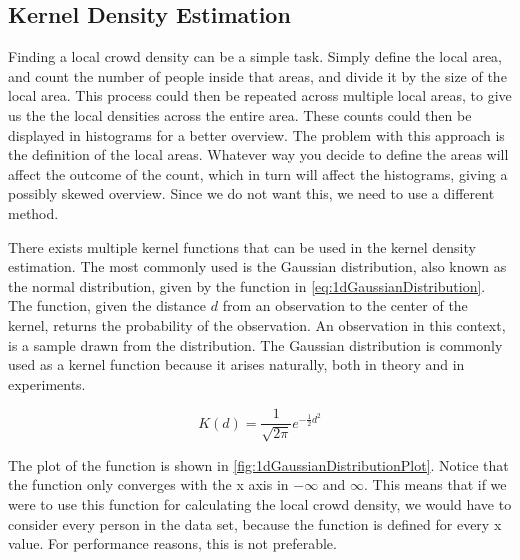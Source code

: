 \subsection{Kernel Density Estimation}

Finding a local crowd density can be a simple task. Simply define the local area, and count the number of people inside that areas, and divide it by the size of the local area. This process could then be repeated across multiple local areas, to give us the the local densities across the entire area. These counts could then be displayed in histograms for a better overview. The problem with this approach is the definition of the local areas. Whatever way you decide to define the areas will affect the outcome of the count, which in turn will affect the histograms, giving a possibly skewed overview. Since we do not want this, we need to use a different method.



There exists multiple kernel functions that can be used in the kernel density estimation. The most commonly used is the Gaussian distribution, also known as the normal distribution, given by the function in \cref{eq:1dGaussianDistribution}. The function, given the distance $d$ from an observation to the center of the kernel, returns the probability of the observation. An observation in this context, is a sample drawn from the distribution. The Gaussian distribution is commonly used as a kernel function because it arises naturally, both in theory and in experiments.

\begin{equation}
\label{eq:1dGaussianDistribution}
K(d) = \frac{1}{\sqrt{2\pi}} e^{-\frac{1}{2} d^2}
\end{equation}

The plot of the function is shown in \cref{fig:1dGaussianDistributionPlot}. Notice that the function only converges with the x axis in $-\infty$ and $\infty$. This means that if we were to use this function for calculating the local crowd density, we would have to consider every person in the data set, because the function is defined for every x value. For performance reasons, this is not preferable.

